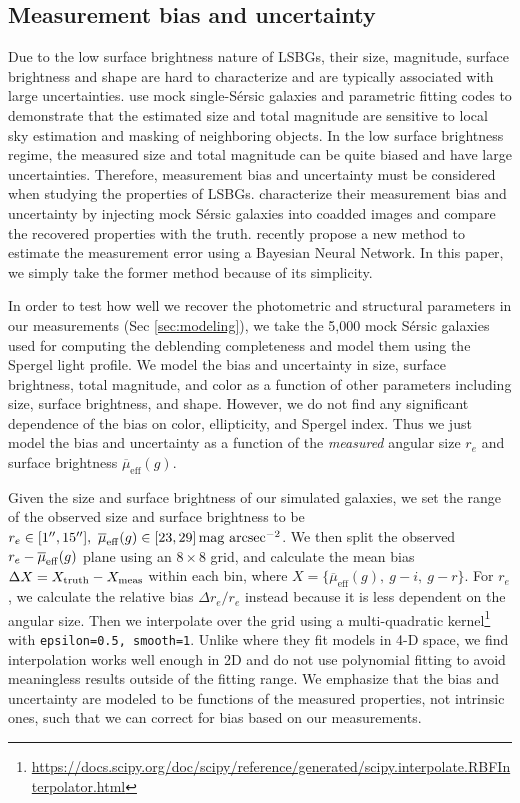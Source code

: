 \documentclass[twocolumn,astrosymb,twocolappendix,linenumbers]{aastex631}
\newcommand{\sbunit}{\mathrm{mag\ arcsec}^{-2}}
\newcommand{\sbeff}{\overline{\mu}_{\mathrm{eff}}(g)}
\newcommand{\code}[1]{\texttt{#1}}
\newcommand{\sersic}{S\'ersic}
\begin{document}
\begin{CJK*}{UTF8}{gbsn}
\subsection{Measurement bias and uncertainty}\label{sec:meas_unc}

Due to the low surface brightness nature of LSBGs, their size, magnitude, surface brightness and shape are hard to characterize and are typically associated with large uncertainties. \citet{Haussler2007} use mock single-\sersic{} galaxies and parametric fitting codes to demonstrate that the estimated size and total magnitude are sensitive to local sky estimation and masking of neighboring objects. In the low surface brightness regime, the measured size and total magnitude can be quite biased and have large uncertainties. Therefore, measurement bias and uncertainty must be considered when studying the properties of LSBGs. \citet{Zaritsky2021,Zaritsky2022} characterize their measurement bias and uncertainty by injecting mock \sersic{} galaxies into coadded images and compare the recovered properties with the truth. \citet{Tanoglidis2022ICML} recently propose a new method to estimate the measurement error using a Bayesian Neural Network. In this paper, we simply take the former method because of its simplicity. 

In order to test how well we recover the photometric and structural parameters in our measurements (Sec \ref{sec:modeling}), we take the 5,000 mock \sersic{} galaxies used for computing the deblending completeness and model them using the Spergel light profile. We model the bias and uncertainty in size, surface brightness, total magnitude, and color as a function of other parameters including size, surface brightness, and shape. However, we do not find any significant dependence of the bias on color, ellipticity, and Spergel index. Thus we just model the bias and uncertainty as a function of the \textit{measured} angular size $r_e$ and surface brightness $\sbeff$.

Given the size and surface brightness of our simulated galaxies, we set the range of the observed size and surface brightness to be $r_e\in[1\arcsec, 15\arcsec],\ \sbeff\in[23, 29]\,\sbunit$. We then split the observed $r_e-\overline{\mu}_{\rm eff}(g)$ plane using an $8\times 8$ grid, and calculate the mean bias $\Delta X = X_{\rm truth} - X_{\rm meas}$ within each bin, where $X=\{\sbeff,\ g-i,\ g-r\}$. For $r_e$, we calculate the relative bias $\Delta r_e / r_e$ instead because it is less dependent on the angular size. Then we interpolate over the grid using a multi-quadratic kernel\footnote{\url{https://docs.scipy.org/doc/scipy/reference/generated/scipy.interpolate.RBFInterpolator.html}} with \code{epsilon=0.5, smooth=1}. Unlike \citet{Zaritsky2021} where they fit models in 4-D space, we find interpolation works well enough in 2D and do not use polynomial fitting to avoid meaningless results outside of the fitting range. We emphasize that the bias and uncertainty are modeled to be functions of the measured properties, not intrinsic ones, such that we can correct for bias based on our measurements. 


\end{CJK*}
\end{document}
